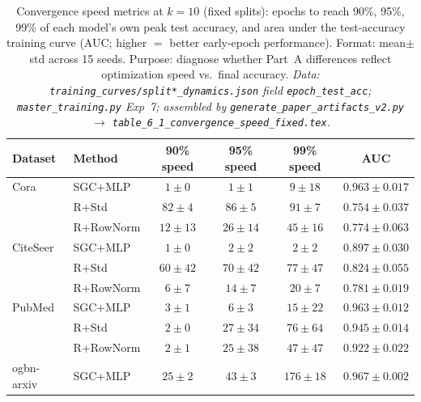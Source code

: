 \documentclass[11pt]{article}
\begin{document}
\begin{table}[H]
\centering\small
\caption{Convergence speed metrics at $k{=}10$ (fixed splits): epochs to reach
90\%, 95\%, 99\% of each model's own peak test accuracy, and area under the test-accuracy
training curve (AUC; higher $=$ better early-epoch performance).
Format: mean$\pm$std across 15 seeds.
Purpose: diagnose whether Part~A differences reflect optimization speed vs.\ final accuracy.
\textit{\scriptsize Data: \texttt{training\_curves/split*\_dynamics.json} field \texttt{epoch\_test\_acc};
\texttt{master\_training.py} Exp~7;
assembled by \texttt{generate\_paper\_artifacts\_v2.py} $\to$ \texttt{table\_6\_1\_convergence\_speed\_fixed.tex}.}}
\label{tab:convergence_speed_fixed}
\begin{tabular}{llcccc}
\toprule
Dataset & Method & 90\% speed & 95\% speed & 99\% speed & AUC \\
\midrule
Cora & SGC+MLP            & $1\pm0$   & $1\pm1$   & $9\pm18$   & $0.963\pm0.017$ \\
     & R+Std              & $82\pm4$  & $86\pm5$  & $91\pm7$   & $0.754\pm0.037$ \\
     & R+RowNorm          & $12\pm13$ & $26\pm14$ & $45\pm16$  & $0.774\pm0.063$ \\
\midrule
CiteSeer & SGC+MLP        & $1\pm0$   & $2\pm2$   & $2\pm2$    & $0.897\pm0.030$ \\
         & R+Std          & $60\pm42$ & $70\pm42$ & $77\pm47$  & $0.824\pm0.055$ \\
         & R+RowNorm      & $6\pm7$   & $14\pm7$  & $20\pm7$   & $0.781\pm0.019$ \\
\midrule
PubMed & SGC+MLP          & $3\pm1$   & $6\pm3$   & $15\pm22$  & $0.963\pm0.012$ \\
       & R+Std            & $2\pm0$   & $27\pm34$ & $76\pm64$  & $0.945\pm0.014$ \\
       & R+RowNorm        & $2\pm1$   & $25\pm38$ & $47\pm47$  & $0.922\pm0.022$ \\
\midrule
ogbn-arxiv & SGC+MLP      & $25\pm2$  & $43\pm3$  & $176\pm18$ & $0.967\pm0.002$ \\

\end{tabular}
\end{table}
\end{document}
